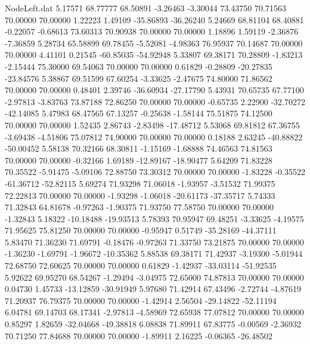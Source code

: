 \begin{filecontents}{NodeLeft.dat}
   5.17571   68.77777   68.50891    -3.26463   -3.30044   73.43750   70.71563   70.00000   70.00000    1.22223    1.49109  -35.86893  -36.26240
   5.24669   68.81104   68.40881    -0.22057   -0.68613   73.60313   70.90938   70.00000   70.00000    1.18896    1.59119   -2.36876   -7.36859
   5.28734   65.58899   69.78455    -5.52081   -4.98363   76.95937   70.14687   70.00000   70.00000    4.41101    0.21545  -60.85035  -54.92948
   5.33807   69.38171   70.28809    -1.83213   -2.15444   75.30000   69.54063   70.00000   70.00000    0.61829   -0.28809  -20.27835  -23.84576
   5.38867   69.51599   67.60254    -3.33625   -2.47675   74.80000   71.86562   70.00000   70.00000    0.48401    2.39746  -36.60934  -27.17790
   5.43931   70.65735   67.77100    -2.97813   -3.83763   73.87188   72.86250   70.00000   70.00000   -0.65735    2.22900  -32.70272  -42.14085
   5.47983   68.47565   67.13257    -0.25638   -1.58144   75.51875   74.12500   70.00000   70.00000    1.52435    2.86743   -2.83498  -17.48712
   5.53068   69.81812   67.36755    -3.69438   -4.51806   75.07812   74.90000   70.00000   70.00000    0.18188    2.63245  -40.88822  -50.00452
   5.58138   70.32166   68.30811    -1.15169   -1.68888   74.46563   74.81563   70.00000   70.00000   -0.32166    1.69189  -12.89167  -18.90477
   5.64209   71.83228   70.35522    -5.91475   -5.09106   72.88750   73.30312   70.00000   70.00000   -1.83228   -0.35522  -61.36712  -52.82115
   5.69274   71.93298   71.06018    -1.93957   -3.51532   71.99375   72.22813   70.00000   70.00000   -1.93298   -1.06018  -20.61173  -37.35717
   5.74333   71.32843   64.81678    -0.97263   -1.90375   71.93750   77.58750   70.00000   70.00000   -1.32843    5.18322  -10.18488  -19.93513
   5.78393   70.95947   69.48251    -3.33625   -4.19575   71.95625   75.81250   70.00000   70.00000   -0.95947    0.51749  -35.28169  -44.37111
   5.83470   71.36230   71.69791    -0.18476   -0.97263   71.33750   73.21875   70.00000   70.00000   -1.36230   -1.69791   -1.96672  -10.35362
   5.88538   69.38171   71.42937    -3.19300   -5.01944   72.68750   72.60625   70.00000   70.00000    0.61829   -1.42937  -33.03114  -51.92535
   5.92622   69.95270   68.54267    -1.29494   -3.04975   72.65000   74.87813   70.00000   70.00000    0.04730    1.45733  -13.12859  -30.91949
   5.97680   71.42914   67.43496    -2.72744   -4.87619   71.20937   76.79375   70.00000   70.00000   -1.42914    2.56504  -29.14822  -52.11194
   6.04781   69.14703   68.17341    -2.97813   -4.58969   72.65938   77.07812   70.00000   70.00000    0.85297    1.82659  -32.04668  -49.38818
   6.08838   71.89911   67.83775    -0.00569   -2.36932   70.71250   77.84688   70.00000   70.00000   -1.89911    2.16225   -0.06365  -26.48502

\end{filecontents}

